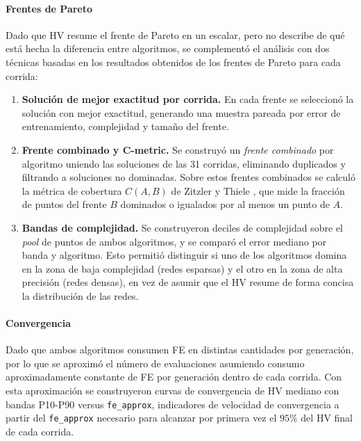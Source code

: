 \paragraph{Frentes de Pareto}

Dado que HV resume el frente de Pareto en un escalar, pero no describe de qué está hecha la diferencia entre algoritmos, se complementó el análisis con dos técnicas basadas en los resultados obtenidos de los frentes de Pareto para cada corrida:

\begin{enumerate}
    \item \textbf{Solución de mejor exactitud por corrida.} En cada frente se seleccionó la solución con mejor exactitud, generando una muestra pareada por error de entrenamiento, complejidad y tamaño del frente.
    \item \textbf{Frente combinado y C-metric.} Se construyó un \textit{frente combinado} por algoritmo uniendo las soluciones de las 31 corridas, eliminando duplicados y filtrando a soluciones no dominadas. Sobre estos frentes combinados se calculó la métrica de cobertura \(C(A,B)\) de Zitzler y Thiele \cite{Zitzler2007HV_revisited}, que mide la fracción de puntos del frente \(B\) dominados o igualados por al menos un punto de \(A\).
    \item \textbf{Bandas de complejidad.} Se construyeron deciles de complejidad sobre el \textit{pool} de puntos de ambos algoritmos, y se comparó el error mediano por banda y algoritmo. Esto permitió distinguir si uno de los algoritmos domina en la zona de baja complejidad (redes esparsas) y el otro en la zona de alta precisión (redes densas), en vez de asumir que el HV resume de forma concisa la distribución de las redes.
\end{enumerate}

\paragraph{Convergencia}

Dado que ambos algoritmos consumen FE en distintas cantidades por generación, por lo que se aproximó el número de evaluaciones asumiendo consumo aproximadamente constante de FE por generación dentro de cada corrida. Con esta aproximación se construyeron curvas de convergencia de HV mediano con bandas P10-P90 versus \texttt{fe\_approx}, indicadores de velocidad de convergencia a partir del \texttt{fe\_approx} necesario para alcanzar por primera vez el \(95\%\) del HV final de cada corrida.

